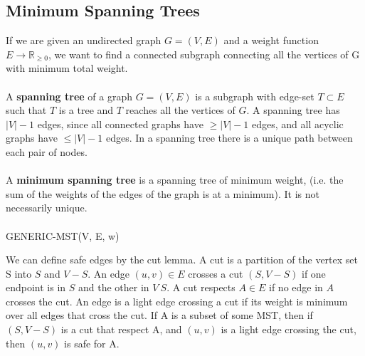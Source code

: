 \documentclass{article}
\begin{document}
    \subsection{Minimum Spanning Trees}
        If we are given an undirected graph $G = (V, E)$ and a weight function $E \to \mathbb{R}_{\geq 0}$, we want to find a connected subgraph connecting all the vertices of G with minimum total weight. \\ \\
        A \textbf{spanning tree} of a graph $G = (V, E)$ is a subgraph with edge-set $T \subset E$ such that $T$ is a tree and $T$ reaches all the vertices of $G$. A spanning tree has $|V| - 1$ edges, since all connected graphs have $\geq |V| - 1$ edges, and all acyclic graphs have $\leq |V| - 1$ edges. In a spanning tree there is a unique path between each pair of nodes. \\ \\
        A \textbf{minimum spanning tree} is a spanning tree of minimum weight, (i.e. the sum of the weights of the edges of the graph is at a minimum). It is not necessarily unique. \\ \\
        GENERIC-MST(V, E, w)
        \begin{algorithmic}
            \EndWhile
        \end{algorithmic}
        We can define safe edges by the cut lemma. A cut is a partition of the vertex set S into $S$ and $V - S$. An edge $(u, v) \in E$ crosses a cut $(S, V - S) $ if one endpoint is in $S$ and the other in $V \ S$. A cut respects $A \in E$ if no edge in $A$ crosses the cut. An edge is a light edge crossing a cut if its weight is minimum over all edges that cross the cut. If A is a subset of some MST, then if $(S, V - S )$ is a cut that respect A, and $(u, v)$ is a light edge crossing the cut, then $(u,v)$ is safe for A.
\end{document}
